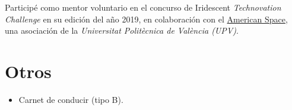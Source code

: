 \documentclass[letterpaper, 12pt]{article}
\newcommand{\uni}{\emph{Universitat Politècnica de València (UPV)}}
\begin{document}
    Participé como mentor voluntario en el concurso de Iridescent \emph{Technovation Challenge} en su edición del año 2019, en colaboración con el \href{https://cdl.upv.es/american-space}{American Space}, una asociación de la \uni.

    \section{Otros}

    \begin{itemize}
        \item Carnet de conducir (tipo B).
    \end{itemize}
\end{document}

